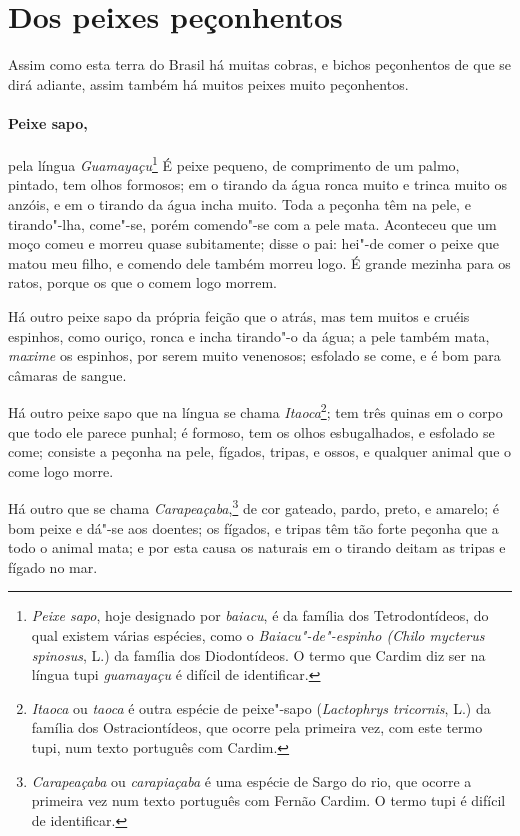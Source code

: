 \section{Dos peixes peçonhentos}
Assim como esta terra do Brasil há muitas cobras, e bichos
peçonhentos de que se dirá adiante, assim também há muitos peixes muito
peçonhentos.

\paragraph{Peixe sapo,} pela língua \textit{Guamayaçu}\footnote{ \textit{Peixe sapo}, 
hoje designado por \textit{baiacu}, é da família
dos Tetrodontídeos, do qual existem várias espécies, como o
\textit{Baiacu"-de"-espinho (Chilo mycterus spinosus}, L.) da família dos
Diodontídeos. O termo que Cardim diz ser na língua tupi
\textit{guamayaçu} é difícil de identificar.} É peixe
pequeno, de comprimento de um palmo, pintado, tem olhos formosos; em o
tirando da água ronca muito e trinca muito os anzóis, e em o tirando da
água incha muito. Toda a peçonha têm na pele, e tirando"-lha, come"-se,
porém comendo"-se com a pele mata. Aconteceu que um moço comeu e morreu
quase subitamente; disse o pai: hei"-de comer o peixe que matou meu
filho, e comendo dele também morreu logo. É grande mezinha para os
ratos, porque os que o comem logo morrem.

 Há outro peixe sapo da própria feição que o atrás, mas tem muitos e
cruéis espinhos, como ouriço, ronca e incha tirando"-o da água; a pele
também mata, \textit{maxime} os espinhos, por serem muito venenosos; esfolado se
come, e é bom para câmaras de sangue.

 Há outro peixe sapo que na língua se chama 
 \textit{Itaoca}\footnote{ \textit{Itaoca} ou \textit{taoca} é outra espécie de peixe"-sapo
(\textit{Lactophrys tricornis}, L.) da família dos Ostraciontídeos, que
ocorre pela primeira vez, com este termo tupi, num texto português com
Cardim.}; tem três quinas em o corpo que todo ele parece punhal; é
formoso, tem os olhos esbugalhados, e esfolado se come; consiste a
peçonha na pele, fígados, tripas, e ossos, e qualquer animal que o come
logo morre.

 Há outro que se chama \textit{Carapeaçaba},\footnote{ \textit{Carapeaçaba} 
ou \textit{carapiaçaba} é uma espécie de Sargo
do rio, que ocorre a primeira vez num texto português com Fernão
Cardim. O termo tupi é difícil de identificar.} de cor gateado, pardo,
preto, e amarelo; é bom peixe e dá"-se aos doentes; os fígados, e tripas
têm tão forte peçonha que a todo o animal mata; e por esta causa os
naturais em o tirando deitam as tripas e fígado no mar.

